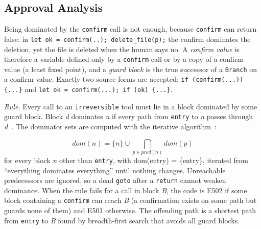 \documentclass[conference]{IEEEtran}
\begin{document}
\subsection{Approval Analysis}
Being dominated by the \texttt{confirm} call is not enough, because \texttt{confirm} can return false: in \texttt{let ok = confirm(..); delete\_file(p);} the confirm dominates the deletion, yet the file is deleted when the human says no. A \emph{confirm value} is therefore a variable defined only by a \texttt{confirm} call or by a copy of a confirm value (a least fixed point), and a \emph{guard block} is the true successor of a \texttt{Branch} on a confirm value. Exactly two source forms are accepted: \texttt{if (confirm(\textquotedbl{}...\textquotedbl{})) \{...\}} and \texttt{let ok = confirm(\textquotedbl{}...\textquotedbl{}); if (ok) \{...\}}.

\emph{Rule.} Every call to an \texttt{irreversible} tool must lie in a block dominated by some guard block. Block \emph{d} dominates \emph{n} if every path from \texttt{entry} to \emph{n} passes through \emph{d}~\cite{allen}. The dominator sets are computed with the iterative algorithm~\cite{aho}:

\begin{equation}
\mathit{dom}(n) = \{n\} \cup \bigcap_{p \in \mathit{pred}(n)} \mathit{dom}(p)
\end{equation}
\noindent for every block \emph{n} other than \texttt{entry}, with dom(entry) = \{entry\}, iterated from ``everything dominates everything'' until nothing changes. Unreachable predecessors are ignored, so a dead \texttt{goto} after a \texttt{return} cannot weaken dominance. When the rule fails for a call in block \emph{B}, the code is E502 if some block containing a \texttt{confirm} can reach \emph{B} (a confirmation exists on some path but guards none of them) and E501 otherwise. The offending path is a shortest path from \texttt{entry} to \emph{B} found by breadth-first search that avoids all guard blocks.
\end{document}
